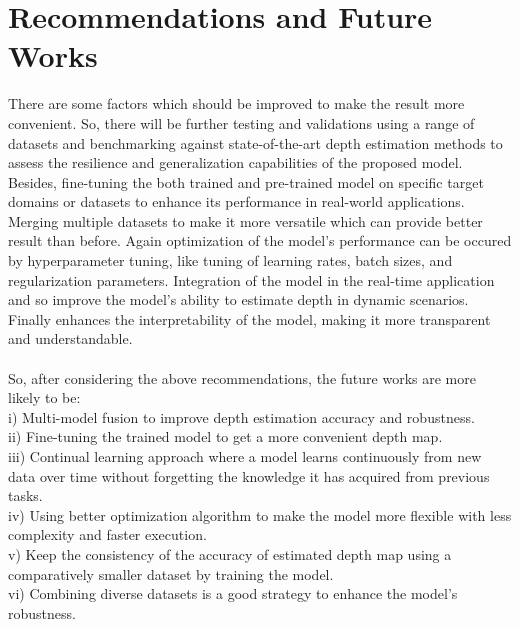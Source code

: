 \documentclass[a4paper,12pt,oneside]{book}
\begin{document}
\section{Recommendations and Future Works}
There are some factors which should be improved to make the result more convenient. So,
there will be further testing and validations using a range of datasets and benchmarking against state-of-the-art depth estimation methods to assess the resilience and generalization capabilities of the proposed model. Besides,  fine-tuning the both trained and pre-trained model on specific target domains or datasets to enhance its performance in real-world applications. Merging multiple datasets to make it more versatile which can provide better result than before. Again optimization of the model's performance can be occured by  hyperparameter tuning, like tuning of learning rates, batch sizes, and regularization parameters. Integration of the model in the real-time application and so improve the model's ability to estimate depth in dynamic scenarios. Finally enhances the interpretability of the model, making it more transparent and understandable.\\\\
So, after considering the above recommendations, the future works are more likely to be:\\
i) Multi-model fusion to improve depth estimation accuracy and robustness.\\
ii) Fine-tuning the trained model to get a more convenient depth map.\\
iii) Continual learning approach where a model learns continuously from new data over time without forgetting the knowledge it has acquired from previous tasks. \\
iv) Using better optimization algorithm to make the model more flexible with less complexity and faster execution.\\
v) Keep the consistency of the accuracy of estimated depth map using a comparatively smaller dataset by training the model.\\
vi) Combining diverse datasets is a good strategy to enhance the model's robustness.

%

\backmatter
%
\renewcommand\bibname{References}
\newpage
{} \label{refs}
\end{document}
